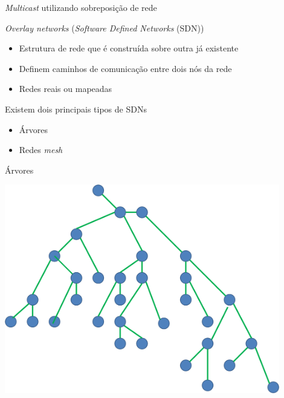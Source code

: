 \documentclass[compress]{beamer}
\begin{document}

\begin{frame}{\textit{Multicast} utilizando sobreposição de rede}

\textit{Overlay networks} (\textit{Software Defined Networks} (SDN))
\begin{itemize}
    \item Estrutura de rede que é construída sobre outra já existente
    \item Definem caminhos de comunicação entre dois nós da rede
    \item Redes reais ou mapeadas
\end{itemize}

\vspace{1cm}

Existem dois principais tipos de SDNs
\begin{itemize}
    \item Árvores
    \item Redes \textit{mesh}
\end{itemize}

\end{frame}


\begin{frame}{Árvores}


\centering\includegraphics[width=0.9\textwidth]{images/arvore.png}

\end{frame}

\end{document}
